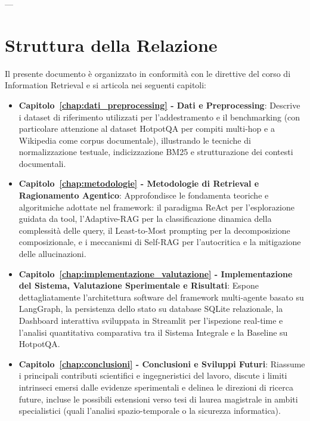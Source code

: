 ---

\section{Struttura della Relazione}
\label{sec:struttura_relazione}

Il presente documento è organizzato in conformità con le direttive del corso di Information Retrieval e si articola nei seguenti capitoli:
\begin{itemize}
    \item \textbf{Capitolo~\ref{chap:dati_preprocessing} - Dati e Preprocessing}: Descrive i dataset di riferimento utilizzati per l'addestramento e il benchmarking (con particolare attenzione al dataset HotpotQA per compiti multi-hop e a Wikipedia come corpus documentale), illustrando le tecniche di normalizzazione testuale, indicizzazione BM25 e strutturazione dei contesti documentali.
    \item \textbf{Capitolo~\ref{chap:metodologie} - Metodologie di Retrieval e Ragionamento Agentico}: Approfondisce le fondamenta teoriche e algoritmiche adottate nel framework: il paradigma ReAct per l'esplorazione guidata da tool, l'Adaptive-RAG per la classificazione dinamica della complessità delle query, il Least-to-Most prompting per la decomposizione composizionale, e i meccanismi di Self-RAG per l'autocritica e la mitigazione delle allucinazioni.
    \item \textbf{Capitolo~\ref{chap:implementazione_valutazione} - Implementazione del Sistema, Valutazione Sperimentale e Risultati}: Espone dettagliatamente l'architettura software del framework multi-agente basato su LangGraph, la persistenza dello stato su database SQLite relazionale, la Dashboard interattiva sviluppata in Streamlit per l'ispezione real-time e l'analisi quantitativa comparativa tra il Sistema Integrale e la Baseline su HotpotQA.
    \item \textbf{Capitolo~\ref{chap:conclusioni} - Conclusioni e Sviluppi Futuri}: Riassume i principali contributi scientifici e ingegneristici del lavoro, discute i limiti intrinseci emersi dalle evidenze sperimentali e delinea le direzioni di ricerca future, incluse le possibili estensioni verso tesi di laurea magistrale in ambiti specialistici (quali l'analisi spazio-temporale o la sicurezza informatica).
\end{itemize}

